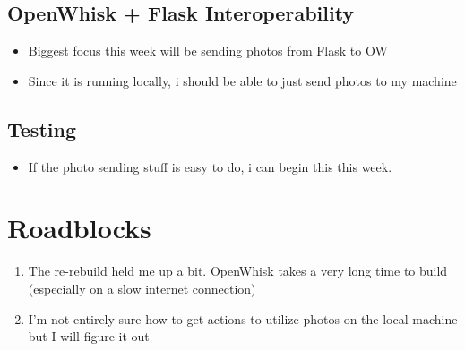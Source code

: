 \documentclass[paper=a4, fontsize=12pt]{scrartcl} %
\numberwithin{equation}{section} %
\numberwithin{figure}{section} %
\numberwithin{table}{section} %
\begin{document}

\subsection{OpenWhisk + Flask Interoperability}
\begin{itemize}
	\item Biggest focus this week will be sending photos from Flask to OW
	\item Since it is running locally, i should be able to just send photos to my machine	
\end{itemize}


\subsection{Testing}
\begin{itemize}
	\item If the photo sending stuff is easy to do, i can begin this this week. 
\end{itemize}



\section{Roadblocks}
\begin{enumerate}
	\item  The re-rebuild held me up a bit. OpenWhisk takes a very long time to build (especially on a slow internet connection)
	\item  I'm not entirely sure how to get actions to utilize photos on the local machine but I will figure it out
\end{enumerate}
\end{document}
